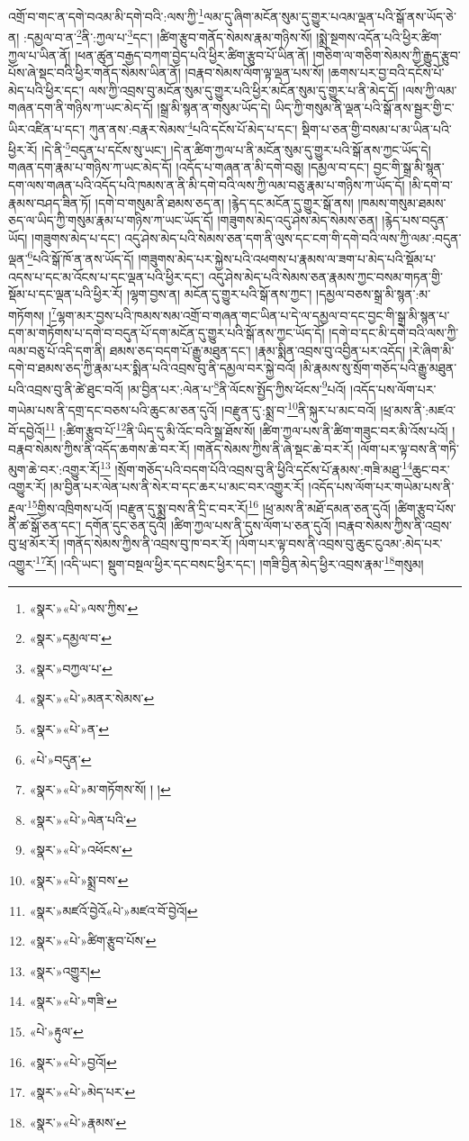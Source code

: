 འགྲོ་བ་གང་ན་དགེ་བའམ་མི་དགེ་བའི་:ལས་ཀྱི་\footnote{«སྣར་»«པེ་»ལས་ཀྱིས་}ལམ་དུ་ཞིག་མངོན་སུམ་དུ་གྱུར་པའམ་ལྡན་པའི་སྒོ་ནས་ཡོད་ཅེ་ན། :དམྱལ་བ་ན་\footnote{«སྣར་»དམྱལ་བ་}ནི་:ཀྱལ་པ་\footnote{«སྣར་»བཀྱལ་པ་}དང་། །ཚིག་རྩུབ་གནོད་སེམས་རྣམ་གཉིས་སོ། །སྨྲེ་སྔགས་འདོན་པའི་ཕྱིར་ཚིག་ཀྱལ་པ་ཡིན་ནོ། །ཕན་ཚུན་བརྒྱད་བཀག་བྱེད་པའི་ཕྱིར་ཚིག་རྩུབ་པོ་ཡིན་ནོ། །གཅིག་ལ་གཅིག་སེམས་ཀྱི་རྒྱུད་རྩུབ་པོས་ཞེ་སྡང་བའི་ཕྱིར་གནོད་སེམས་ཡིན་ནོ། །བརྣབ་སེམས་ལོག་ལྟ་ལྡན་པས་སོ། །ཆགས་པར་བྱ་བའི་དངོས་པོ་མེད་པའི་ཕྱིར་དང་། ལས་ཀྱི་འབྲས་བུ་མངོན་སུམ་དུ་གྱུར་པའི་ཕྱིར་མངོན་སུམ་དུ་གྱུར་པ་ནི་མེད་དོ། །ལས་ཀྱི་ལམ་གཞན་དག་ནི་གཉིས་ཀ་ཡང་མེད་དོ། །སྒྲ་མི་སྙན་ན་གསུམ་ཡོད་དེ། ཡིད་ཀྱི་གསུམ་ནི་ལྡན་པའི་སྒོ་ནས་སྦྱར་གྱི་ང་ཡིར་འཛིན་པ་དང་། ཀུན་ནས་:བརྣར་སེམས་\footnote{«སྣར་»«པེ་»མནར་སེམས་}པའི་དངོས་པོ་མེད་པ་དང་། སྡིག་པ་ཅན་གྱི་བསམ་པ་མ་ཡིན་པའི་ཕྱིར་རོ། །དེ་ནི་\footnote{«སྣར་»«པེ་»ན་}བདུན་པ་དངོས་སུ་ཡང་། །དེ་ན་ཚིག་ཀྱལ་པ་ནི་མངོན་སུམ་དུ་གྱུར་པའི་སྒོ་ནས་ཀྱང་ཡོད་དེ། གཞན་དག་རྣམ་པ་གཉིས་ཀ་ཡང་མེད་དོ། །འདོད་པ་གཞན་ན་མི་དགེ་བཅུ། །དམྱལ་བ་དང་། བྱང་གི་སྒྲ་མི་སྙན་དག་ལས་གཞན་པའི་འདོད་པའི་ཁམས་ན་ནི་མི་དགེ་བའི་ལས་ཀྱི་ལམ་བཅུ་རྣམ་པ་གཉིས་ཀ་ཡོད་དོ། །མི་དགེ་བ་རྣམས་བཤད་ཟིན་ཏོ། །དགེ་བ་གསུམ་ནི་ཐམས་ཅད་ན། །རྙེད་དང་མངོན་དུ་གྱུར་སྒོ་ནས། །ཁམས་གསུམ་ཐམས་ཅད་ལ་ཡིད་ཀྱི་གསུམ་རྣམ་པ་གཉིས་ཀ་ཡང་ཡོད་དོ། །གཟུགས་མེད་འདུ་ཤེས་མེད་སེམས་ཅན། །རྙེད་པས་བདུན་ཡོད། །གཟུགས་མེད་པ་དང་། འདུ་ཤེས་མེད་པའི་སེམས་ཅན་དག་ནི་ལུས་དང་ངག་གི་དགེ་བའི་ལས་ཀྱི་ལམ་:བདུན་ལྡན་\footnote{«པེ་»བདུན་}པའི་སྒོ་ཁོ་ན་ནས་ཡོད་དོ། །གཟུགས་མེད་པར་སྐྱེས་པའི་འཕགས་པ་རྣམས་ལ་ཟག་པ་མེད་པའི་སྡོམ་པ་འདས་པ་དང་མ་འོངས་པ་དང་ལྡན་པའི་ཕྱིར་དང་། འདུ་ཤེས་མེད་པའི་སེམས་ཅན་རྣམས་ཀྱང་བསམ་གཏན་གྱི་སྡོམ་པ་དང་ལྡན་པའི་ཕྱིར་རོ། །ལྷག་བྱས་ན། མངོན་དུ་གྱུར་པའི་སྒོ་ནས་ཀྱང་། །དམྱལ་བཅས་སྒྲ་མི་སྙན་:མ་གཏོགས། །\footnote{«སྣར་»«པེ་»མ་གཏོགས་སོ། ། །}ལྷག་མར་བྱས་པའི་ཁམས་སམ་འགྲོ་བ་གཞན་གང་ཡིན་པ་དེ་ལ་དམྱལ་བ་དང་བྱང་གི་སྒྲ་མི་སྙན་པ་དག་མ་གཏོགས་པ་དགེ་བ་བདུན་པོ་དག་མངོན་དུ་གྱུར་པའི་སྒོ་ནས་ཀྱང་ཡོད་དོ། །དགེ་བ་དང་མི་དགེ་བའི་ལས་ཀྱི་ལམ་བཅུ་པོ་འདི་དག་ནི། ཐམས་ཅད་བདག་པོ་རྒྱུ་མཐུན་དང་། །རྣམ་སྨིན་འབྲས་བུ་འབྱིན་པར་འདོད། །རེ་ཞིག་མི་དགེ་བ་ཐམས་ཅད་ཀྱི་རྣམ་པར་སྨིན་པའི་འབྲས་བུ་ནི་དམྱལ་བར་སྐྱེ་བའོ། །མི་རྣམས་སུ་སྲོག་གཅོད་པའི་རྒྱུ་མཐུན་པའི་འབྲས་བུ་ནི་ཚེ་ཐུང་བའོ། །མ་བྱིན་པར་:ལེན་པ་\footnote{«སྣར་»«པེ་»ལེན་པའི་}ནི་ལོངས་སྤྱོད་ཀྱིས་ཕོངས་\footnote{«སྣར་»«པེ་»འཕོངས་}པའོ། །འདོད་པས་ལོག་པར་གཡེམ་པས་ནི་དགྲ་དང་བཅས་པའི་ཆུང་མ་ཅན་དུའོ། །བརྫུན་དུ་:སྨྲ་བ་\footnote{«སྣར་»«པེ་»སྨྲ་བས་}ནི་སྐུར་པ་མང་བའོ། །ཕྲ་མས་ནི་:མཛའ་བོ་དབྱེའོ།\footnote{«སྣར་»མཛའོ་བྱེའོ«པེ་»མཛའ་བོ་བྱེའོ།} །:ཚིག་རྩུབ་པོ་\footnote{«སྣར་»«པེ་»ཚིག་རྩུབ་པོས་}ནི་ཡིད་དུ་མི་འོང་བའི་སྒྲ་ཐོས་སོ། །ཚིག་ཀྱལ་པས་ནི་ཚིག་གཟུང་བར་མི་འོས་པའོ། །བརྣབ་སེམས་ཀྱིས་ནི་འདོད་ཆགས་ཆེ་བར་རོ། །གནོད་སེམས་ཀྱིས་ནི་ཞེ་སྡང་ཆེ་བར་རོ། །ལོག་པར་ལྟ་བས་ནི་གཏི་མུག་ཆེ་བར་:འགྱུར་རོ།\footnote{«སྣར་»འགྱུར།} །སྲོག་གཅོད་པའི་བདག་པོའི་འབྲས་བུ་ནི་ཕྱིའི་དངོས་པོ་རྣམས་:གཟི་མཐུ་\footnote{«སྣར་»«པེ་»གཟི་}ཆུང་བར་འགྱུར་རོ། །མ་བྱིན་པར་ལེན་པས་ནི་སེར་བ་དང་ཆར་པ་མང་བར་འགྱུར་རོ། །འདོད་པས་ལོག་པར་གཡེམ་པས་ནི་རྡུལ་\footnote{«པེ་»རྟུལ་}གྱིས་འཁྲིགས་པའོ། །བརྫུན་དུ་སྨྲ་བས་ནི་དྲི་ང་བར་རོ།\footnote{«སྣར་»«པེ་»བྱའོ།} །ཕྲ་མས་ནི་མཐོ་དམན་ཅན་དུའོ། །ཚིག་རྩུབ་པོས་ནི་ཚ་སྒོ་ཅན་དང་། དགོན་དུང་ཅན་དུའོ། །ཚིག་ཀྱལ་པས་ནི་དུས་ལོག་པ་ཅན་དུའོ། །བརྣབ་སེམས་ཀྱིས་ནི་འབྲས་བུ་ཕྲ་མོར་རོ། །གནོད་སེམས་ཀྱིས་ནི་འབྲས་བུ་ཁ་བར་རོ། །ལོག་པར་ལྟ་བས་ནི་འབྲས་བུ་ཆུང་ངུའམ་:མེད་པར་འགྱུར་\footnote{«སྣར་»«པེ་»མེད་པར་}རོ། །འདི་ཡང་། སྡུག་བསྔལ་ཕྱིར་དང་བསང་ཕྱིར་དང་། །གཟི་བྱིན་མེད་ཕྱིར་འབྲས་རྣམ་\footnote{«སྣར་»«པེ་»རྣམས་}གསུམ། 
